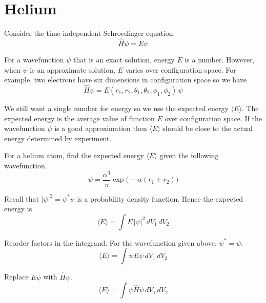 

\section*{Helium}
Consider the time-independent Schroedinger equation.
\begin{equation*}
\hat{H}\psi=E\psi
\end{equation*}

For a wavefunction $\psi$ that is an exact solution, energy $E$ is a number.
However, when $\psi$ is an approximate solution, $E$ varies over configuration space.
For example, two electrons have six dimensions in configuration space so we have
\begin{equation*}
\hat{H}\psi=E(r_1,r_2,\theta_1,\theta_2,\phi_1,\phi_2)\,\psi
\end{equation*}

We still want a single number for energy so we use the expected energy $\langle E\rangle$.
The expected energy is the average value of function $E$ over configuration space.
If the wavefunction $\psi$ is a good approximation
then $\langle E\rangle$ should be close to the actual energy determined by experiment.

\bigskip
For a helium atom, find the expected energy $\langle E\rangle$ given the following wavefunction.
\begin{equation*}
\psi=\frac{\alpha^3}{\pi}\exp\bigl(-\alpha (r_1+r_2)\bigr)
\end{equation*}

Recall that $|\psi|^2=\psi^*\psi$ is a probability density function.
Hence the expected energy is
\begin{equation*}
\langle E\rangle=\int E\,|\psi|^2\,dV_1\,dV_2
\end{equation*}

Reorder factors in the integrand.
For the wavefunction given above, $\psi^*=\psi$.
\begin{equation*}
\langle E\rangle=\int\psi E\psi\,dV_1\,dV_2
\end{equation*}

Replace $E\psi$ with $\hat{H}\psi$.
\begin{equation*}
\langle E\rangle=\int\psi\hat{H}\psi\,dV_1\,dV_2
\end{equation*}

